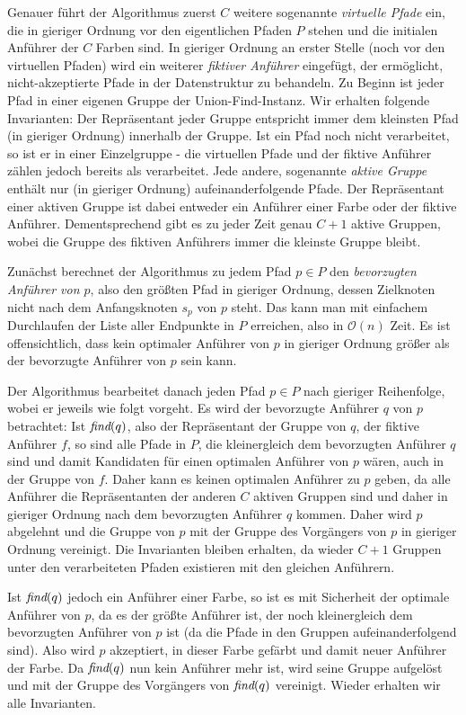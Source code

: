 Genauer führt der Algorithmus zuerst $C$ weitere sogenannte {\em virtuelle Pfade} ein, die in gieriger Ordnung
vor den eigentlichen Pfaden $P$ stehen und die initialen Anführer der $C$ Farben sind.
In gieriger Ordnung an erster Stelle (noch vor den virtuellen Pfaden) wird ein weiterer {\em fiktiver Anführer}
eingefügt, der ermöglicht, nicht-akzeptierte Pfade in der Datenstruktur zu behandeln.
Zu Beginn ist jeder Pfad in einer eigenen Gruppe der Union-Find-Instanz.
Wir erhalten folgende Invarianten:
Der Repräsentant jeder Gruppe entspricht immer dem kleinsten Pfad (in gieriger Ordnung) innerhalb der Gruppe.
Ist ein Pfad noch nicht verarbeitet, so ist er in einer Einzelgruppe - die virtuellen Pfade und der fiktive Anführer
zählen jedoch bereits als verarbeitet.
Jede andere, sogenannte {\em aktive Gruppe} enthält nur (in gieriger Ordnung) aufeinanderfolgende Pfade.
Der Repräsentant einer aktiven Gruppe ist dabei entweder ein Anführer einer Farbe oder der fiktive Anführer.
Dementsprechend gibt es zu jeder Zeit genau $C+1$ aktive Gruppen, wobei die Gruppe des fiktiven
Anführers immer die kleinste Gruppe bleibt.

Zunächst berechnet der Algorithmus zu jedem Pfad $p \in P$ den {\em bevorzugten Anführer von $p$}, also den größten Pfad
in gieriger Ordnung, dessen Zielknoten nicht nach dem Anfangsknoten $s_p$ von $p$ steht.
Das kann man mit einfachem Durchlaufen der Liste aller Endpunkte in $P$ erreichen, also in $\mathcal O(n)$ Zeit.
Es ist offensichtlich, dass kein optimaler Anführer von $p$ in gieriger Ordnung größer als der bevorzugte Anführer von
$p$ sein kann.

Der Algorithmus bearbeitet danach jeden Pfad $p \in P$ nach gieriger Reihenfolge, wobei er jeweils wie folgt vorgeht.
Es wird der bevorzugte Anführer $q$ von $p$ betrachtet:
Ist $\text{\em find}(q)$, also der Repräsentant der Gruppe von $q$, der fiktive Anführer $f$, so sind alle Pfade in $P$, die kleinergleich dem bevorzugten Anführer $q$
sind und damit Kandidaten für einen optimalen Anführer von $p$ wären, auch in der Gruppe von $f$. Daher kann es keinen optimalen Anführer zu $p$ geben,
da alle Anführer die Repräsentanten der anderen $C$ aktiven Gruppen sind und daher in gieriger Ordnung nach dem bevorzugten Anführer $q$ kommen.
Daher wird $p$ abgelehnt und die Gruppe von $p$ mit der Gruppe des Vorgängers von $p$ in gieriger Ordnung vereinigt.
Die Invarianten bleiben erhalten, da wieder $C+1$ Gruppen unter den verarbeiteten Pfaden existieren mit den gleichen
Anführern.

Ist $\text{\em find}(q)$ jedoch ein Anführer einer Farbe, so ist es mit Sicherheit der optimale Anführer von $p$, da es der größte
Anführer ist, der noch kleinergleich dem bevorzugten Anführer von $p$ ist (da die Pfade in den Gruppen
aufeinanderfolgend sind).
Also wird $p$ akzeptiert, in dieser Farbe gefärbt und damit neuer Anführer der Farbe.
Da $\text{\em find}(q)$ nun kein Anführer mehr ist, wird seine Gruppe aufgelöst und mit der Gruppe des Vorgängers von $\text{\em find}(q)$
vereinigt.
Wieder erhalten wir alle Invarianten.

